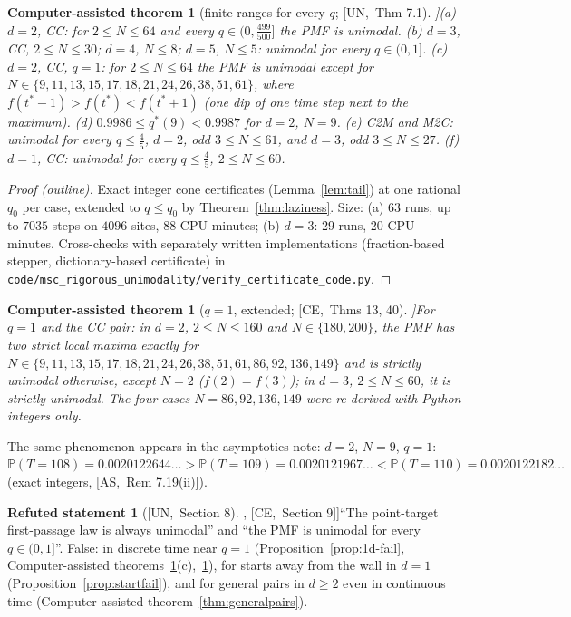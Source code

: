 \documentclass[10pt,a4paper]{article}
\theoremstyle{plain}
\newtheorem{catheorem}[theorem]{Computer-assisted theorem}
\theoremstyle{definition}
\newtheorem{refuted}[theorem]{Refuted statement}
\newcommand{\src}[2]{[\textsf{#1},~#2]}           %
\newcommand{\ASY}{\textsf{AS}}
\newcommand{\UNI}{\textsf{UN}}
\newcommand{\CER}{\textsf{CE}}
\renewcommand{\P}{\mathbb{P}}
\begin{document}
\begin{catheorem}[finite ranges for every $q$; \src{\UNI}{Thm 7.1}]\label{thm:finite-cc}
(a) $d=2$, CC: for $2\le N\le64$ and every $q\in(0,\frac{499}{500}]$ the PMF is unimodal.
(b) $d=3$, CC, $2\le N\le30$; $d=4$, $N\le8$; $d=5$, $N\le5$: unimodal for every $q\in(0,1]$.
(c) $d=2$, CC, $q=1$: for $2\le N\le64$ the PMF is unimodal except for $N\in\{9,11,13,15,17,18,21,24,26,38,51,61\}$, where $f(t^*-1)>f(t^*)<f(t^*+1)$ (one dip of one time step next to the maximum).
(d) $0.9986\le q^*(9)<0.9987$ for $d=2$, $N=9$.
(e) C2M and M2C: unimodal for every $q\le\frac45$, $d=2$, odd $3\le N\le61$, and $d=3$, odd $3\le N\le27$.
(f) $d=1$, CC: unimodal for every $q\le\frac45$, $2\le N\le60$.
\end{catheorem}
\begin{proof}[Proof (outline)]
Exact integer cone certificates (Lemma~\ref{lem:tail}) at one rational $q_0$ per case, extended to $q\le q_0$ by Theorem~\ref{thm:laziness}. Size: (a) $63$ runs, up to $7035$ steps on $4096$ sites, 88 CPU-minutes; (b) $d=3$: 29 runs, 20 CPU-minutes. Cross-checks with separately written implementations (fraction-based stepper, dictionary-based certificate) in \texttt{code/msc\_rigorous\_unimodality/verify\_certificate\_code.py}.
\end{proof}

\begin{catheorem}[$q=1$, extended; \src{\CER}{Thms 13, 40}]\label{thm:q1-cc}
For $q=1$ and the CC pair: in $d=2$, $2\le N\le160$ and $N\in\{180,200\}$, the PMF has two strict local maxima exactly for $N\in\{9,11,13,15,17,18,21,24,26,38,51,61,86,92,136,149\}$ and is strictly unimodal otherwise, except $N=2$ ($f(2)=f(3)$); in $d=3$, $2\le N\le60$, it is strictly unimodal. The four cases $N=86,92,136,149$ were re-derived with Python integers only.
\end{catheorem}
The same phenomenon appears in the asymptotics note: $d=2$, $N=9$, $q=1$: $\P(T=108)=0.0020122644\ldots>\P(T=109)=0.0020121967\ldots<\P(T=110)=0.0020122182\ldots$ (exact integers, \src{\ASY}{Rem 7.19(ii)}).

\begin{refuted}[\src{\UNI}{Section 8}, \src{\CER}{Section 9}]\label{ref:unimodalall}
``The point-target first-passage law is always unimodal'' and ``the PMF is unimodal for every $q\in(0,1]$''. False: in discrete time near $q=1$ (Proposition~\ref{prop:1d-fail}, Computer-assisted theorems~\ref{thm:finite-cc}(c),~\ref{thm:q1-cc}), for starts away from the wall in $d=1$ (Proposition~\ref{prop:startfail}), and for general pairs in $d\ge2$ even in continuous time (Computer-assisted theorem~\ref{thm:generalpairs}).
\end{refuted}
\end{document}
